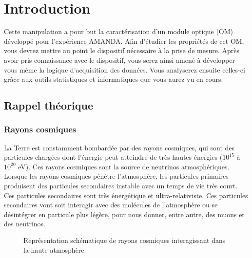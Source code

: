 \section{Introduction}

Cette manipulation a pour but la caractérisation d'un module optique (OM) développé pour l'expérience AMANDA. Afin d'étudier les propriétés de cet OM, vous devrez mettre au point le dispositif nécessaire à la prise de mesure. Après avoir pris connaissance avec le dispositif, vous serez ainsi amené à développer vous même la logique d'acquisition des données. Vous analyserez ensuite celles-ci grâce aux outils statistiques et informatiques que vous aurez vu en cours. 

\subsection{Rappel théorique}

\subsubsection{Rayons cosmiques}
La Terre est constamment bombardée par des rayons cosmiques, qui sont des particules chargées dont l'énergie peut atteindre de très hautes énergies ($10^{15}$ à $10^{20}$ eV). Ces rayons cosmiques sont la source de neutrinos atmosphériques. Lorsque les rayons cosmiques pénètre l'atmosphère, les particules primaires produisent des particules secondaires instable avec un temps de vie très court. Ces particules secondaires sont très énergétique et ultra-relativiste. Ces particules secondaires vont soit interagir avec des molécules de l'atmosphère ou se désintégrer en particule plus légère, pour nous donner, entre autre, des muons et des neutrinos.\\

\begin{figure}[h!]
    \caption{\label{fig:CR} Représentation schématique de rayons cosmiques interagissant dans la haute atmosphère.}
\end{figure}

